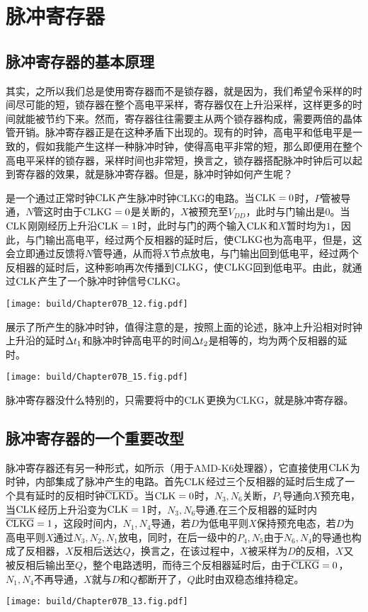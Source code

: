 \section{脉冲寄存器}

\subsection{脉冲寄存器的基本原理}
其实，之所以我们总是使用寄存器而不是锁存器，就是因为，我们希望令采样的时间尽可能的短，锁存器在整个高电平采样，寄存器仅在上升沿采样，这样更多的时间就能被节约下来。然而，寄存器往往需要主从两个锁存器构成，需要两倍的晶体管开销。脉冲寄存器正是在这种矛盾下出现的。现有的时钟，高电平和低电平是一致的，假如我能产生这样一种脉冲时钟，使得高电平非常的短，那么即便用在整个高电平采样的锁存器，采样时间也非常短，换言之，锁存器搭配脉冲时钟后可以起到寄存器的效果，就是脉冲寄存器。但是，脉冲时钟如何产生呢？

是一个通过正常时钟$\CLK$产生脉冲时钟CLKG的电路。当$\CLK=0$时，$P$管被导通，$N$管这时由于$\text{CLKG}=0$是关断的，$X$被预充至$V_{DD}$，此时与门输出是$0$。当$\CLK$刚刚经历上升沿$\CLK=1$时，此时与门的两个输入$\CLK$和$X$暂时均为$1$，因此，与门输出高电平，经过两个反相器的延时后，使$\text{CLKG}$也为高电平，但是，这会立即通过反馈将$N$管导通，从而将$X$节点放电，与门输出回到低电平，经过两个反相器的延时后，这种影响再次传播到$\text{CLKG}$，使$\text{CLKG}$回到低电平。由此，就通过$\CLK$产生了一个脉冲时钟信号$\text{CLKG}$。

\begin{Figure}[脉冲产生电路]
    \texttt{[image: build/Chapter07B\_12.fig.pdf]}
\end{Figure}

展示了所产生的脉冲时钟，值得注意的是，按照上面的论述，脉冲上升沿相对时钟上升沿的延时$\Delta{t_1}$和脉冲时钟高电平的时间$\Delta{t_2}$是相等的，均为两个反相器的延时。

\begin{Figure}[脉冲时钟]
    \texttt{[image: build/Chapter07B\_15.fig.pdf]}
\end{Figure}

脉冲寄存器没什么特别的，只需要将中的$\CLK$更换为CLKG，就是脉冲寄存器。

\subsection{脉冲寄存器的一个重要改型}
脉冲寄存器还有另一种形式，如所示（用于AMD-K6处理器），它直接使用$\CLK$为时钟，内部集成了脉冲产生的电路。首先$\CLK$经过三个反相器的延时后生成了一个具有延时的反相时钟$\overline{\text{CLKD}}$。当$\CLK=0$时，$N_3,N_6$关断，$P_1$导通向$X$预充电，当$\CLK$经历上升沿变为$\CLK=1$时，$N_3,N_6$导通,在三个反相器的延时内$\overline{\text{CLKG}}=1$，这段时间内，$N_1,N_4$导通，若$D$为低电平则$X$保持预充电态，若$D$为高电平则$X$通过$N_3,N_2,N_1$放电，同时，在后一级中的$P_4,N_5$由于$N_6,N_4$的导通也构成了反相器，$X$反相后送达$Q$，换言之，在该过程中，$X$被采样为$D$的反相，$X$又被反相后输出至$Q$，整个电路透明，而待三个反相器延时后，由于$\overline{\text{CLKG}}=0$，$N_1,N_4$不再导通，$X$就与$D$和$Q$都断开了，$Q$此时由双稳态维持稳定。

\begin{Figure}[脉冲寄存器的另一形式]
    \texttt{[image: build/Chapter07B\_13.fig.pdf]}
\end{Figure}